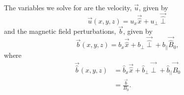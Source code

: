The variables we solve for are the velocity, $\vec{u}$, given by
\begin{equation}
    \vec{u}(x,y,z) = u_x\vec{\hat{x}} + u_\perp \vec{\hat{\perp}}
\end{equation}
and the magnetic field perturbations, $\vec{b}$, given by
\begin{equation}
    \vec{b}(x,y,z) = b_x\vec{\hat{x}} + b_\perp \vec{\hat{\perp}} + b_{||}\vec{\hat{B}}_0,
\end{equation}
where
\begin{equation}
\begin{aligned}
    \vec{\hat{b}}(x,y,z) &= \hat{b}_x\vec{\hat{x}} + \hat{b}_\perp \vec{\hat{\perp}} + \hat{b}_{||}\vec{\hat{B}}_0 \\
    &= \frac{\vec{b}}{B_0}.
\end{aligned}
\end{equation}

